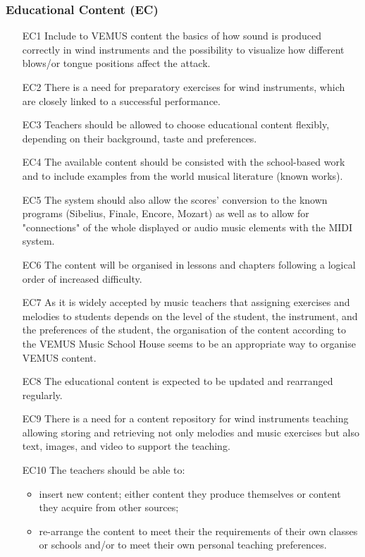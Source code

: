 \subsubsection{Educational Content (EC)}
\begin{itemize}
\item[EC1] Include to VEMUS content the basics of how sound is produced correctly in wind instruments and the possibility to visualize how different blows/or tongue positions affect the attack.
\item[EC2] There is a need for preparatory exercises for wind instruments, which are closely linked to a successful performance.
\item[EC3] Teachers should be allowed to choose educational content flexibly, depending on their background, taste and preferences.
\item[EC4] The available content should be consisted with the school-based work and to include examples from the world musical literature (known works).
\item[EC5] The system should also allow the scores’ conversion to the known programs (Sibelius, Finale, Encore, Mozart) as well as to allow for "connections" of the whole displayed or audio music elements with the MIDI system.
\item[EC6] The content will be organised  in lessons and chapters following a logical order of increased difficulty.
\item[EC7] As it is widely accepted by music teachers that assigning exercises and melodies to students depends on the level of the student, the instrument, and the preferences of the student, the organisation of the content according to the VEMUS Music School House seems to be an appropriate way to organise VEMUS content.
\item[EC8] The educational content is expected to be updated and rearranged regularly.
\item[EC9] There is a need for a content repository for wind instruments teaching allowing storing and retrieving not only melodies and music exercises but also text, images, and video to support the teaching.
\item[EC10] The teachers should be able to:\begin{itemize}
\item insert new content; either content they produce themselves or content they acquire from other sources;
\item re-arrange the content to meet their the requirements of their own classes or schools and/or to meet their own personal teaching preferences.
\end{itemize}

\end{itemize}